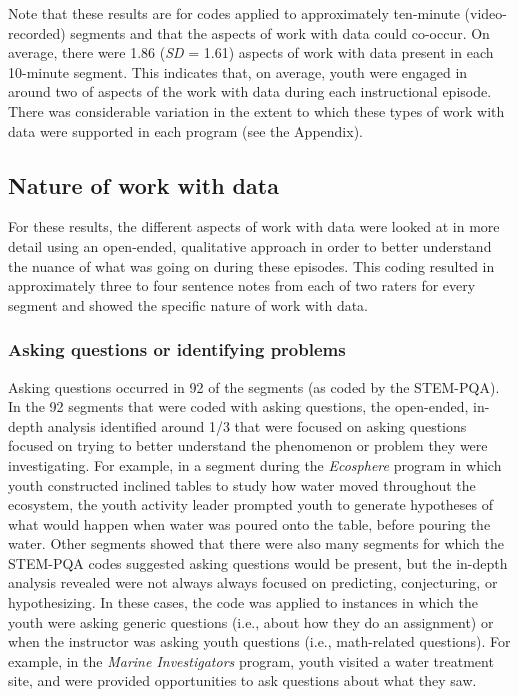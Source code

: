 \documentclass[]{book}
\theoremstyle{definition}
\theoremstyle{definition}
\theoremstyle{definition}
\theoremstyle{remark}
\begin{document}
Note that these results are for codes applied to approximately
ten-minute (video-recorded) segments and that the aspects of work with
data could co-occur. On average, there were 1.86 (\emph{SD} = 1.61)
aspects of work with data present in each 10-minute segment. This
indicates that, on average, youth were engaged in around two of aspects
of the work with data during each instructional episode. There was
considerable variation in the extent to which these types of work with
data were supported in each program (see the Appendix).

\subsection{Nature of work with data}\label{nature-of-work-with-data}

For these results, the different aspects of work with data were looked
at in more detail using an open-ended, qualitative approach in order to
better understand the nuance of what was going on during these episodes.
This coding resulted in approximately three to four sentence notes from
each of two raters for every segment and showed the specific nature of
work with data.

\subsubsection{Asking questions or identifying
problems}\label{asking-questions-or-identifying-problems}

Asking questions occurred in 92 of the segments (as coded by the
STEM-PQA). In the 92 segments that were coded with asking questions, the
open-ended, in-depth analysis identified around 1/3 that were focused on
asking questions focused on trying to better understand the phenomenon
or problem they were investigating. For example, in a segment during the
\emph{Ecosphere} program in which youth constructed inclined tables to
study how water moved throughout the ecosystem, the youth activity
leader prompted youth to generate hypotheses of what would happen when
water was poured onto the table, before pouring the water. Other
segments showed that there were also many segments for which the
STEM-PQA codes suggested asking questions would be present, but the
in-depth analysis revealed were not always always focused on predicting,
conjecturing, or hypothesizing. In these cases, the code was applied to
instances in which the youth were asking generic questions (i.e., about
how they do an assignment) or when the instructor was asking youth
questions (i.e., math-related questions). For example, in the
\emph{Marine Investigators} program, youth visited a water treatment
site, and were provided opportunities to ask questions about what they
saw.
\end{document}
